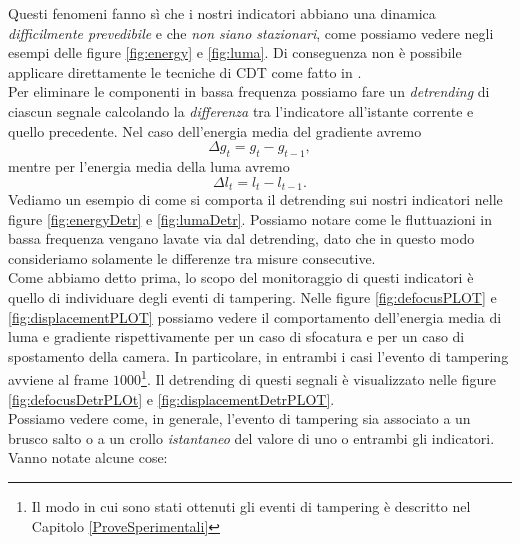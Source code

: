 Questi fenomeni fanno s\`i che i nostri indicatori abbiano una dinamica \textit{difficilmente prevedibile} e che \textit{non siano stazionari}, come possiamo vedere negli esempi delle figure \ref{fig:energy} e \ref{fig:luma}.
Di conseguenza non \`e possibile applicare direttamente le tecniche di CDT come fatto in \cite{alippi2010detecting}. \\
Per eliminare le componenti in bassa frequenza possiamo fare un \textit{detrending} di ciascun segnale calcolando la \textit{differenza} tra l'indicatore all'istante corrente e quello precedente.
Nel caso dell'energia media del gradiente avremo
\begin{equation}
\label{eq:gradientDetr}
\Delta g_t = g_t - g_{t-1},
\end{equation}
mentre per l'energia media della luma avremo
\begin{equation}
\label{eq:lumaDetr}
\Delta l_t = l_t - l_{t -1}.
\end{equation}
Vediamo un esempio di come si comporta il detrending sui nostri indicatori nelle figure \ref{fig:energyDetr} e \ref{fig:lumaDetr}.  
Possiamo notare come le fluttuazioni in bassa frequenza vengano lavate via dal detrending, dato che in questo modo consideriamo solamente le differenze tra misure consecutive.\\
Come abbiamo detto prima, lo scopo del monitoraggio di questi indicatori \`e quello di individuare degli eventi di tampering.
Nelle figure \ref{fig:defocusPLOT} e \ref{fig:displacementPLOT} possiamo vedere il comportamento dell'energia media di luma e gradiente rispettivamente per un caso di sfocatura e per un caso di spostamento della camera.  
In particolare, in entrambi i casi l'evento di tampering avviene al frame $1000$\footnote{Il modo in cui sono stati ottenuti gli eventi di tampering \`e descritto nel Capitolo \ref{ProveSperimentali}}.
Il detrending di questi segnali \`e visualizzato nelle figure \ref{fig:defocusDetrPLOt} e \ref{fig:displacementDetrPLOT}.\\
\noindent Possiamo vedere come, in generale, l'evento di tampering sia associato a un brusco salto o a un crollo \textit{istantaneo} del valore di uno o entrambi gli indicatori.
Vanno notate alcune cose:

